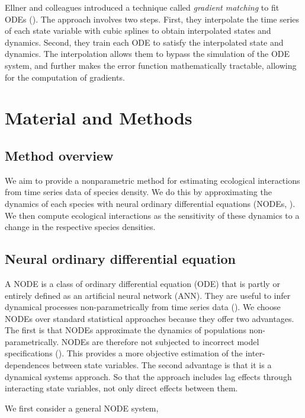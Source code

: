 \documentclass[11pt, oneside]{article}
\begin{document}
Ellner and colleagues introduced a technique called \textit{gradient matching} to fit ODEs (\cite{Ellner2002}).
The approach involves two steps. 
First, they interpolate the time series of each state variable with cubic splines to obtain interpolated states and dynamics. 
Second, they train each ODE to satisfy the interpolated state and dynamics. 
The interpolation allows them to bypass the simulation of the ODE system, and further makes the error function mathematically tractable, allowing for the computation of gradients. 
%

\section{Material and Methods}

\subsection{Method overview}

We aim to provide a nonparametric method for estimating ecological interactions from time series data of species density. 
We do this by approximating the dynamics of each species with neural ordinary differential equations (NODEs, \cite{Bonnaffe2021a}). 
We then compute ecological interactions as the sensitivity of these dynamics to a change in the respective species densities.

\subsection{Neural ordinary differential equation}

A NODE is a class of ordinary differential equation (ODE) that is partly or entirely defined as an artificial neural network (ANN).
They are useful to infer dynamical processes non-parametrically from time series data (\cite{Bonnaffe2021a}).
We choose NODEs over standard statistical approaches because they offer two advantages. 
The first is that NODEs approximate the dynamics of populations non-parametrically.
NODEs are therefore not subjected to incorrect model specifications (\cite{Jost2000,Adamson2013}).
This provides a more objective estimation of the inter-dependences between state variables. 
The second advantage is that it is a dynamical systems approach. 
So that the approach includes lag effects through interacting state variables, not only direct effects between them. 

We first consider a general NODE system,
\end{document}
